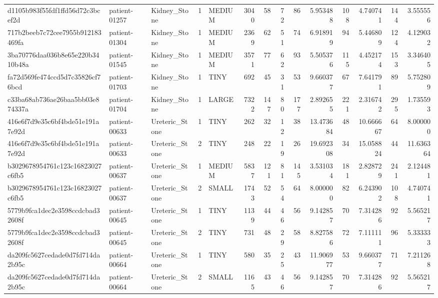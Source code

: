 \begin{tabular}{lllrlrrrrrrrrr}
d1105b983f55fdf1ffd56d72c3bcef2d & patient-01257 & Kidney_Stone & 1 & MEDIUM & 3040 & 58 & 72 & 86 & 5.953488 & 108 & 4.740741 & 144 & 3.555556 \\
717b2beeb7c72cee7955b912183469fa & patient-01304 & Kidney_Stone & 1 & MEDIUM & 2369 & 62 & 51 & 74 & 6.918919 & 94 & 5.446809 & 124 & 4.129032 \\
3ba70776daa036b8e65e220b3410b48a & patient-01545 & Kidney_Stone & 1 & MEDIUM & 3571 & 77 & 62 & 93 & 5.505376 & 115 & 4.452174 & 153 & 3.346405 \\
fa72d569fe474ccd5d7c35826cf76bcd & patient-01703 & Kidney_Stone & 1 & TINY & 692 & 45 & 31 & 53 & 9.660377 & 67 & 7.641791 & 89 & 5.752809 \\
c33ba68ab736ae26baa5bb03e874337a & patient-01704 & Kidney_Stone & 1 & LARGE & 7322 & 147 & 80 & 177 & 2.892655 & 221 & 2.316742 & 295 & 1.735593 \\
416e6f7d9e35c6bf4bde51e191a7e92d & patient-00633 & Ureteric_Stone & 1 & TINY & 262 & 32 & 12 & 38 & 13.473684 & 48 & 10.666667 & 64 & 8.000000 \\
416e6f7d9e35c6bf4bde51e191a7e92d & patient-00633 & Ureteric_Stone & 2 & TINY & 248 & 22 & 19 & 26 & 19.692308 & 34 & 15.058824 & 44 & 11.636364 \\
b3029678954761c123c16823027c6fb5 & patient-00637 & Ureteric_Stone & 1 & MEDIUM & 5837 & 121 & 81 & 145 & 3.531034 & 181 & 2.828729 & 241 & 2.124481 \\
b3029678954761c123c16823027c6fb5 & patient-00637 & Ureteric_Stone & 2 & SMALL & 1743 & 52 & 54 & 64 & 8.000000 & 82 & 6.243902 & 108 & 4.740741 \\
5779b9fca1dec2e3598ccdcbad32608f & patient-00645 & Ureteric_Stone & 1 & TINY & 1139 & 44 & 46 & 56 & 9.142857 & 70 & 7.314286 & 92 & 5.565217 \\
5779b9fca1dec2e3598ccdcbad32608f & patient-00645 & Ureteric_Stone & 2 & TINY & 731 & 48 & 29 & 58 & 8.827586 & 72 & 7.111111 & 96 & 5.333333 \\
da209fc5627cedade0d7fd714da2b95c & patient-00664 & Ureteric_Stone & 1 & TINY & 580 & 35 & 25 & 43 & 11.906977 & 53 & 9.660377 & 71 & 7.211268 \\
da209fc5627cedade0d7fd714da2b95c & patient-00664 & Ureteric_Stone & 2 & SMALL & 1165 & 43 & 46 & 56 & 9.142857 & 70 & 7.314286 & 92 & 5.565217 \\
\bottomrule
\end{tabular}
